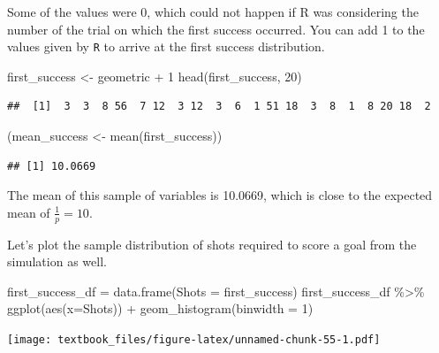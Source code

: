\documentclass[
  11pt,
]{book}
\newenvironment{Shaded}{\begin{snugshade}}{\end{snugshade}}
\newcommand{\AttributeTok}[1]{\textcolor[rgb]{0.77,0.63,0.00}{#1}}
\newcommand{\DecValTok}[1]{\textcolor[rgb]{0.00,0.00,0.81}{#1}}
\newcommand{\FunctionTok}[1]{\textcolor[rgb]{0.00,0.00,0.00}{#1}}
\newcommand{\NormalTok}[1]{#1}
\newcommand{\OtherTok}[1]{\textcolor[rgb]{0.56,0.35,0.01}{#1}}
\newcommand{\SpecialCharTok}[1]{\textcolor[rgb]{0.00,0.00,0.00}{#1}}
\theoremstyle{definition}
\theoremstyle{definition}
\theoremstyle{definition}
\theoremstyle{definition}
\theoremstyle{remark}
\begin{document}
Some of the values were 0, which could not happen if R was considering the number of the trial on which the first success occurred. You can add 1 to the values given by \texttt{R} to arrive at the first success distribution.

\begin{Shaded}
\begin{Highlighting}[]
\NormalTok{first\_success }\OtherTok{\textless{}{-}}\NormalTok{ geometric }\SpecialCharTok{+} \DecValTok{1}
\FunctionTok{head}\NormalTok{(first\_success, }\DecValTok{20}\NormalTok{)}
\end{Highlighting}
\end{Shaded}

\begin{verbatim}
##  [1]  3  3  8 56  7 12  3 12  3  6  1 51 18  3  8  1  8 20 18  2
\end{verbatim}

\begin{Shaded}
\begin{Highlighting}[]
\NormalTok{(mean\_success }\OtherTok{\textless{}{-}} \FunctionTok{mean}\NormalTok{(first\_success))}
\end{Highlighting}
\end{Shaded}

\begin{verbatim}
## [1] 10.0669
\end{verbatim}

The mean of this sample of variables is 10.0669, which is close to the expected mean of \(\frac{1}{p} = 10\).

Let's plot the sample distribution of shots required to score a goal from the simulation as well.

\begin{Shaded}
\begin{Highlighting}[]
\NormalTok{first\_success\_df }\OtherTok{=} \FunctionTok{data.frame}\NormalTok{(}\AttributeTok{Shots =}\NormalTok{ first\_success)}
\NormalTok{first\_success\_df }\SpecialCharTok{\%\textgreater{}\%} \FunctionTok{ggplot}\NormalTok{(}\FunctionTok{aes}\NormalTok{(}\AttributeTok{x=}\NormalTok{Shots)) }\SpecialCharTok{+} \FunctionTok{geom\_histogram}\NormalTok{(}\AttributeTok{binwidth =} \DecValTok{1}\NormalTok{)}
\end{Highlighting}
\end{Shaded}

\texttt{[image: textbook\_files/figure-latex/unnamed-chunk-55-1.pdf]}

\newpage
\end{document}
